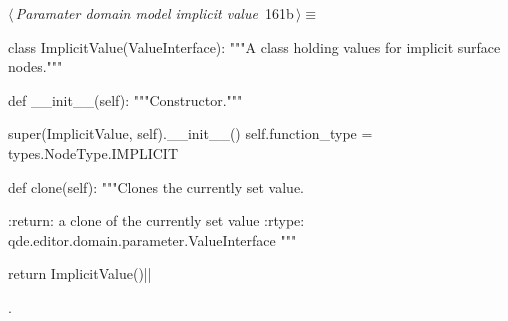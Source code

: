 \documentclass[%
    a4paper,    %
    justified,  %
    nobib,      %
    openany     %
]{tufte-book}
\begin{document}
\begin{flushleft} \small
\begin{minipage}{\linewidth}\label{scrap186}\raggedright\small
{} $\langle\,${\itshape Paramater domain model implicit value}\nobreak\ {\footnotesize {161b}}$\,\rangle\equiv$
\vspace{-1ex}
\begin{pythoncode}
class ImplicitValue(ValueInterface):
    """A class holding values for implicit surface nodes."""

    def __init__(self):
        """Constructor."""

        super(ImplicitValue, self).__init__()
        self.function_type = types.NodeType.IMPLICIT

    def clone(self):
        """Clones the currently set value.

        :return: a clone of the currently set value
        :rtype:  qde.editor.domain.parameter.ValueInterface
        """

        return ImplicitValue()|\NWsep|
\end{pythoncode}
\vspace{1.5ex}
\footnotesize
\begin{list}{}{\setlength{\itemsep}{-\parsep}\setlength{\itemindent}{-\leftmargin}}
\item {\NWtxtMacroNoRef}.

\item{}
\end{list}
\end{minipage}\vspace{4ex}
\end{flushleft}
\end{document}
